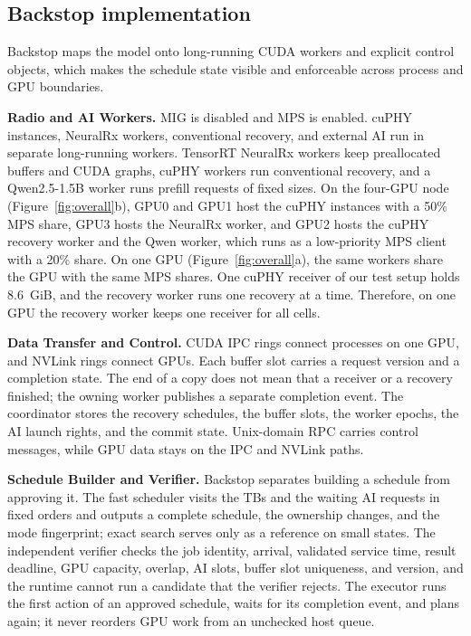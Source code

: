 \documentclass[acmsmall,screen,review,anonymous]{acmart}
\newcommand{\sys}{Backstop\xspace}
\newcommand{\NRx}{NeuralRx\xspace}
\begin{document}
\subsection{Backstop implementation}
\label{sec:implementation}

\sys maps the model onto long-running CUDA workers and explicit control objects, which makes the schedule
state visible and enforceable across process and GPU boundaries.

\noindent\textbf{Radio and AI Workers.}
MIG is disabled and MPS is enabled. cuPHY instances, \NRx workers, conventional recovery, and external AI
run in separate long-running workers. TensorRT \NRx workers keep preallocated buffers and CUDA graphs,
cuPHY workers run conventional recovery, and a Qwen2.5-1.5B worker runs prefill requests of fixed sizes.
On the four-GPU node (Figure~\ref{fig:overall}b), GPU0 and GPU1 host the cuPHY instances with a 50\% MPS
share, GPU3 hosts the \NRx worker, and GPU2 hosts the cuPHY recovery worker and the Qwen worker, which
runs as a low-priority MPS client with a 20\% share. On one GPU (Figure~\ref{fig:overall}a), the same
workers share the GPU with the same MPS shares. One cuPHY receiver of our test setup holds 8.6~GiB, and
the recovery worker runs one recovery at a time. Therefore, on one GPU the recovery worker keeps one
receiver for all cells.

\noindent\textbf{Data Transfer and Control.}
CUDA IPC rings connect processes on one GPU, and NVLink rings connect GPUs. Each buffer slot carries a
request version and a completion state. The end of a copy does not mean that a receiver or a recovery
finished; the owning worker publishes a separate completion event. The coordinator stores the recovery
schedules, the buffer slots, the worker epochs, the AI launch rights, and the commit state. Unix-domain
RPC carries control messages, while GPU data stays on the IPC and NVLink paths.

\noindent\textbf{Schedule Builder and Verifier.}
\sys separates building a schedule from approving it. The fast scheduler visits the TBs and the waiting
AI requests in fixed orders and outputs a complete schedule, the ownership changes, and the mode
fingerprint; exact search serves only as a reference on small states. The independent verifier checks
the job identity, arrival, validated service time, result deadline, GPU capacity, overlap, AI slots,
buffer slot uniqueness, and version, and the runtime cannot run a candidate that the verifier rejects.
The executor runs the first action of an approved schedule, waits for its completion event, and plans
again; it never reorders GPU work from an unchecked host queue.
\end{document}
